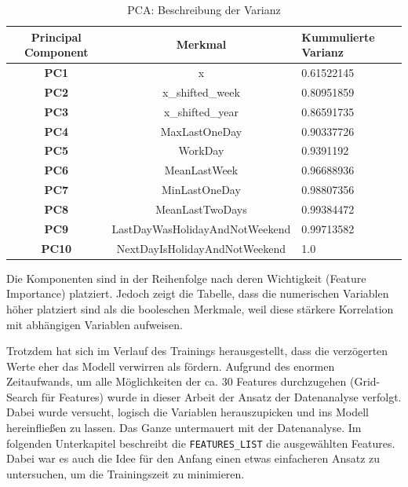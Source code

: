 \documentclass[11pt,ngerman,a4paper,]{article}
\begin{document}
\begin{table}[h!]
\centering
\begin{tabularx}{\textwidth}{|c|c|X|}
\hline
\textbf{Principal Component} & \textbf{Merkmal}                        & \textbf{Kummulierte Varianz} \\ \hline
\textbf{PC1}                 & x                                      & 0.61522145                              \\ \hline
\textbf{PC2}                 & x\_shifted\_week                       & 0.80951859                              \\ \hline
\textbf{PC3}                 & x\_shifted\_year                       & 0.86591735                              \\ \hline
\textbf{PC4}                 & MaxLastOneDay                          & 0.90337726                              \\ \hline
\textbf{PC5}                 & WorkDay                                & 0.9391192                               \\ \hline
\textbf{PC6}                 & MeanLastWeek                           & 0.96688936                              \\ \hline
\textbf{PC7}                 & MinLastOneDay                          & 0.98807356                              \\ \hline
\textbf{PC8}                 & MeanLastTwoDays                        & 0.99384472                              \\ \hline
\textbf{PC9}                 & LastDayWasHolidayAndNotWeekend         & 0.99713582                              \\ \hline
\textbf{PC10}                & NextDayIsHolidayAndNotWeekend          & 1.0                                     \\ \hline
\end{tabularx}
\caption{PCA: Beschreibung der Varianz}
\label{table:pc_explained_variance}
\end{table}

Die Komponenten sind in der Reihenfolge nach deren Wichtigkeit (Feature Importance) platziert. Jedoch zeigt die Tabelle, dass die numerischen Variablen höher platziert sind als die booleschen Merkmale, weil diese stärkere Korrelation mit abhängigen Variablen aufweisen.

Trotzdem hat sich im Verlauf des Trainings herausgestellt, dass die verzögerten Werte eher das Modell verwirren als fördern. Aufgrund des enormen Zeitaufwands, um alle Möglichkeiten der ca. 30 Features durchzugehen (Grid-Search für Features) wurde in dieser Arbeit
der Ansatz der Datenanalyse verfolgt. Dabei wurde versucht, logisch die Variablen herauszupicken und ins Modell hereinfließen zu lassen. Das Ganze untermauert mit der Datenanalyse. Im folgenden Unterkapitel beschreibt die \texttt{FEATURES\_LIST} die ausgewählten Features. Dabei war es auch die Idee für den Anfang einen etwas einfacheren Ansatz zu untersuchen, um die Trainingszeit zu minimieren.
\end{document}
